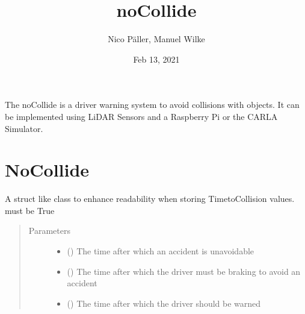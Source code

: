 \documentclass[letterpaper,10pt,english]{sphinxmanual}
\title{noCollide}
\date{Feb 13, 2021}
\author{Nico Päller, Manuel Wilke}
\begin{document}
\pagestyle{empty}
\sphinxmaketitle
\pagestyle{plain}
\sphinxtableofcontents
\pagestyle{normal}
\label{\detokenize{index::doc}}


The noCollide is a driver warning system to avoid collisions with objects. It can be implemented using LiDAR Sensors and
a Raspberry Pi or the CARLA Simulator.

\ignorespaces 

\chapter{NoCollide}
\label{\detokenize{no_collide:nocollide}}\label{\detokenize{no_collide:index-0}}\label{\detokenize{no_collide::doc}}

\begin{fulllineitems}
\label{\detokenize{no_collide:lib.nocollide.TtcTimes}}
A struct like class to enhance readability when storing Time\sphinxhyphen{}to\sphinxhyphen{}Collision values.
 must be True
\begin{quote}\begin{description}
\item[{Parameters}] \leavevmode\begin{itemize}
\item {} 
 () \textendash{} The time after which an accident is unavoidable

\item {} 
 () \textendash{} The time after which the driver must be braking to avoid an accident

\item {} 
 () \textendash{} The time after which the driver should be warned

\end{itemize}

\end{description}\end{quote}

\end{fulllineitems}
\end{document}
